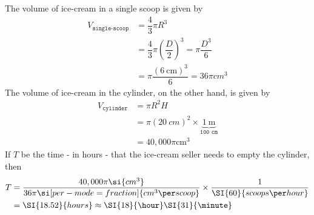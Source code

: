 \begin{solution}[\fullpage]
	The volume of ice-cream in a single scoop is given by
	\begin{align}
		V_{\texttt{single-scoop}} &= \dfrac{4}{3}\pi R^3 \\
		                 &= \dfrac{4}{3}\pi(\dfrac{D}{2})^3 = \pi\dfrac{D^3}{6} \\
		                 &= \pi\dfrac{(\SI{6}{\centi\meter})^3}{6} = 36\pi\si{cm^3}
	\end{align}
	The volume of ice-cream in the cylinder, on the other hand, is given by
	\begin{align}
		V_{\texttt{cylinder}} &= \pi R^2 H \\
		                      &= \pi(\SI{20}{cm})^2\times\underbrace{\SI{1}{\meter}}_{\texttt{100 cm}} \\
		                      &= 40,000\pi\si{\centi\meter}^3
	\end{align} 
	If $T$ be the time - in hours - that the ice-cream seller needs to empty the cylinder, then
	\begin{align}
		T &= \dfrac{40,000\pi\si{cm^3}}{36\pi\si[per-mode=fraction]{cm^3\per scoop}}
		     \times \dfrac{1}{\SI{60}{scoops\per hour}} \\
		  &= \SI{18.52}{hours}\approx \SI{18}{\hour}\SI{31}{\minute}
	\end{align}
\end{solution}
